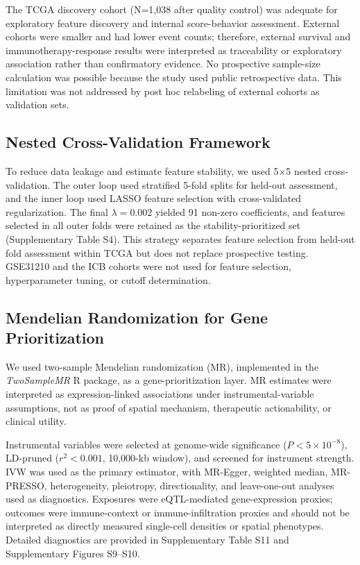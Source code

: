 \documentclass[pdflatex,sn-mathphys-num,referee,lineno]{sn-jnl}
\theoremstyle{thmstyleone}%
\theoremstyle{thmstyletwo}%
\theoremstyle{thmstylethree}%
\begin{document}
The TCGA discovery cohort (N=1,038 after quality control) was adequate for exploratory feature discovery and internal score-behavior assessment. External cohorts were smaller and had lower event counts; therefore, external survival and immunotherapy-response results were interpreted as traceability or exploratory association rather than confirmatory evidence. No prospective sample-size calculation was possible because the study used public retrospective data. This limitation was not addressed by post hoc relabeling of external cohorts as validation sets.

\subsection{Nested Cross-Validation Framework}\label{sec:nested_cv}

To reduce data leakage and estimate feature stability, we used 5$\times$5 nested cross-validation. The outer loop used stratified 5-fold splits for held-out assessment, and the inner loop used LASSO feature selection with cross-validated regularization. The final $\lambda = 0.002$ yielded 91 non-zero coefficients, and features selected in all outer folds were retained as the stability-prioritized set (Supplementary Table S4). This strategy separates feature selection from held-out fold assessment within TCGA but does not replace prospective testing. GSE31210 and the ICB cohorts were not used for feature selection, hyperparameter tuning, or cutoff determination.

\subsection{Mendelian Randomization for Gene Prioritization}

We used two-sample Mendelian randomization \cite{hemaniMRbasePlatformSupports2018b} (MR), implemented in the \textit{TwoSampleMR} R package, as a gene-prioritization layer. MR estimates were interpreted as expression-linked associations under instrumental-variable assumptions, not as proof of spatial mechanism, therapeutic actionability, or clinical utility.

Instrumental variables were selected at genome-wide significance ($P < 5 \times 10^{-8}$), LD-pruned ($r^2 < 0.001$, 10,000-kb window), and screened for instrument strength. IVW was used as the primary estimator, with MR-Egger, weighted median, MR-PRESSO, heterogeneity, pleiotropy, directionality, and leave-one-out analyses used as diagnostics. Exposures were eQTL-mediated gene-expression proxies; outcomes were immune-context or immune-infiltration proxies and should not be interpreted as directly measured single-cell densities or spatial phenotypes. Detailed diagnostics are provided in Supplementary Table S11 and Supplementary Figures S9--S10.
\end{document}
